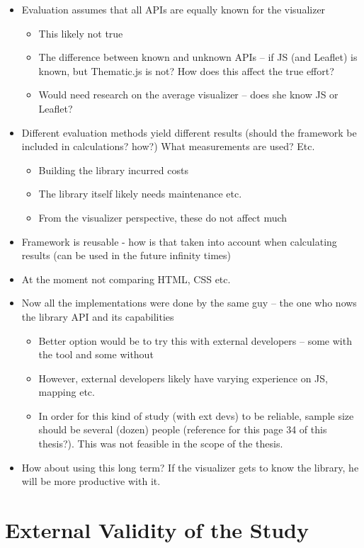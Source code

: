 \begin{itemize}
	\item Evaluation assumes that all APIs are equally known for the visualizer
	\begin{itemize}
		\item This likely not true
		\item The difference between known and unknown APIs -- if JS (and Leaflet) is known, but Thematic.js is not? How does this affect the true effort?
		\item Would need research on the average visualizer -- does she know JS or Leaflet?
	\end{itemize}
	\item Different evaluation methods yield different results (should the framework be included in calculations? how?) What measurements are used? Etc.
	\begin{itemize}
		\item Building the library incurred costs
		\item The library itself likely needs maintenance etc.
		\item From the visualizer perspective, these do not affect much
	\end{itemize}
	\item Framework is reusable - how is that taken into account when calculating results (can be used in the future infinity times)
	\item At the moment not comparing HTML, CSS etc.
	\item Now all the implementations were done by the same guy -- the one who nows the library API and its capabilities
	\begin{itemize}
		\item Better option would be to try this with external developers -- some with the tool and some without
		\item However, external developers likely have varying experience on JS, mapping etc.
		\item In order for this kind of study (with ext devs) to be reliable, sample size should be several (dozen) people (reference for this page 34 of this thesis?). This was not feasible in the scope of the thesis.
	\end{itemize}
	\item How about using this long term? If the visualizer gets to know the library, he will be more productive with it.
\end{itemize}

\section{External Validity of the Study}

